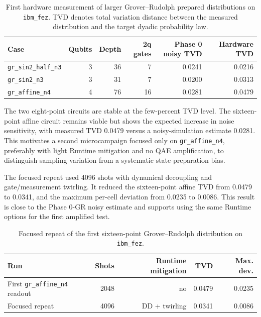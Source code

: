 \begin{table}[h]
\centering
\begin{tabular}{lrrrrr}
\toprule
Case & Qubits & Depth & 2q gates & Phase 0 noisy TVD & Hardware TVD \\
\midrule
\texttt{gr\_sin2\_half\_n3} & 3 & 36 & 7 & 0.0241 & 0.0216 \\
\texttt{gr\_sin2\_n3} & 3 & 31 & 7 & 0.0200 & 0.0313 \\
\texttt{gr\_affine\_n4} & 4 & 76 & 16 & 0.0281 & 0.0479 \\
\bottomrule
\end{tabular}
\caption{First hardware measurement of larger Grover--Rudolph prepared
distributions on \texttt{ibm\_fez}. TVD denotes total variation distance between
the measured distribution and the target dyadic probability law.}
\label{tab:phase3-gr-distribution-results}
\end{table}

The two eight-point circuits are stable at the few-percent TVD level. The
sixteen-point affine circuit remains viable but shows the expected increase in
noise sensitivity, with measured TVD 0.0479 versus a noisy-simulation estimate
0.0281. This motivates a second microcampaign focused only on
\texttt{gr\_affine\_n4}, preferably with light Runtime mitigation and no QAE
amplification, to distinguish sampling variation from a systematic
state-preparation bias.

The focused repeat used 4096 shots with dynamical decoupling and gate/measurement
twirling. It reduced the sixteen-point affine TVD from 0.0479 to 0.0341, and
the maximum per-cell deviation from 0.0235 to 0.0086. This result is close to
the Phase 0-GR noisy estimate and supports using the same Runtime options for
the first amplified test.

\begin{table}[h]
\centering
\begin{tabular}{lrrrr}
\toprule
Run & Shots & Runtime mitigation & TVD & Max. dev. \\
\midrule
First \texttt{gr\_affine\_n4} readout & 2048 & no & 0.0479 & 0.0235 \\
Focused repeat & 4096 & DD + twirling & 0.0341 & 0.0086 \\
\bottomrule
\end{tabular}
\caption{Focused repeat of the first sixteen-point Grover--Rudolph distribution
on \texttt{ibm\_fez}.}
\label{tab:gr-affine-repeat}
\end{table}

